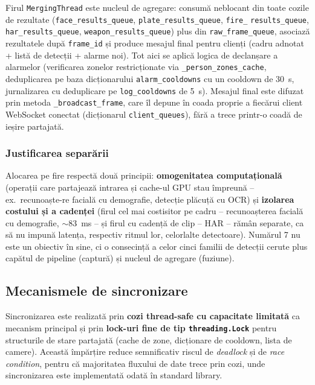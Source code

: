 \documentclass[../../main.tex]{subfiles}
\begin{document}
Firul \texttt{MergingThread} este nucleul de agregare: consumă neblocant din toate cozile de rezultate (\texttt{face\_results\_queue}, \texttt{plate\_results\_queue}, \texttt{fire\_} \linebreak \texttt{results\_queue}, \texttt{har\_results\_queue}, \texttt{weapon\_results\_queue}) plus din \linebreak \texttt{raw\_frame\_queue}, asociază rezultatele după \texttt{frame\_id} și produce mesajul final pentru clienți (cadru adnotat + listă de detecții + alarme noi). Tot aici se aplică logica de declanșare a alarmelor (verificarea zonelor restricționate via \texttt{\_person\_zones\_cache}, deduplicarea pe baza dicționarului \texttt{alarm\_cooldowns} cu un cooldown de 30~s, jurnalizarea cu deduplicare pe \texttt{log\_cooldowns} de 5~s). Mesajul final este difuzat prin metoda \texttt{\_broadcast\_frame}, care îl depune în coada proprie a fiecărui client WebSocket conectat (dicționarul \texttt{client\_queues}), fără a trece printr-o coadă de ieșire partajată.

\subsubsection{Justificarea separării}

Alocarea pe fire respectă două principii: \textbf{omogenitatea computațională} (operații care partajează intrarea și cache-ul GPU stau împreună -- ex.\ recunoaște-re facială cu demografie, detecție plăcuță cu OCR) și \textbf{izolarea costului și a cadenței} (firul cel mai costisitor pe cadru -- recunoașterea facială cu demografie, $\sim$83~ms -- și firul cu cadență de clip -- HAR -- rămân separate, ca să nu impună latența, respectiv ritmul lor, celorlalte detectoare). Numărul 7 nu este un obiectiv în sine, ci o consecință a celor cinci familii de detecții cerute plus capătul de pipeline (captură) și nucleul de agregare (fuziune).

\subsection{Mecanismele de sincronizare}
\label{subsec:sincronizare}

Sincronizarea este realizată prin \textbf{cozi thread-safe cu capacitate limitată} ca mecanism principal și prin \textbf{lock-uri fine de tip \texttt{threading.Lock}} pentru structurile de stare partajată (cache de zone, dicționare de cooldown, lista de camere). Această împărțire reduce semnificativ riscul de \emph{deadlock} și de \emph{race condition}, pentru că majoritatea fluxului de date trece prin cozi, unde sincronizarea este implementată odată în standard library.
\end{document}
